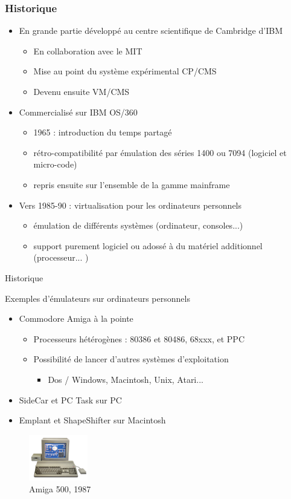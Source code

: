 \begin{frame}
\frametitle{Historique}
\begin{itemize}

\item <1>En grande partie développé au centre scientifique de Cambridge d'IBM
\begin{itemize}
\item En collaboration avec le MIT
\item Mise au point du système expérimental CP/CMS
\item Devenu ensuite VM/CMS
\end{itemize}
\item <2>Commercialisé sur IBM OS/360
\begin{itemize}
\item 1965 : introduction du temps partagé
\item rétro-compatibilité par émulation des séries 1400 ou 7094 (logiciel et micro-code)
\item repris ensuite sur l'ensemble de la gamme mainframe
\end{itemize}
\item <3>Vers 1985-90 : virtualisation pour les ordinateurs personnels
\begin{itemize}
\item émulation de différents systèmes (ordinateur, consoles...)
\item support purement logiciel ou adossé à du matériel additionnel (processeur... )
\end{itemize}
\end{itemize}
\end{frame}

\begin{frame}{Historique}
\begin{exampleblock}{Exemples d'émulateurs sur ordinateurs personnels}
\begin{itemize}
\item Commodore Amiga à la pointe
\begin{itemize}
\item Processeurs hétérogènes : 80386 et 80486, 68xxx, et PPC
\item Possibilité de lancer d'autres systèmes d'exploitation
\begin{itemize}
\item Dos / Windows, Macintosh, Unix, Atari...
\end{itemize}
\end{itemize}
\item SideCar et PC Task sur PC
\item Emplant et ShapeShifter sur Macintosh
\end{itemize}
\end{exampleblock}
\begin{figure}
\includegraphics[height=2cm]{../illustration/Amiga500_system.jpg}
\caption{Amiga 500, 1987}
\end{figure}
\end{frame}

